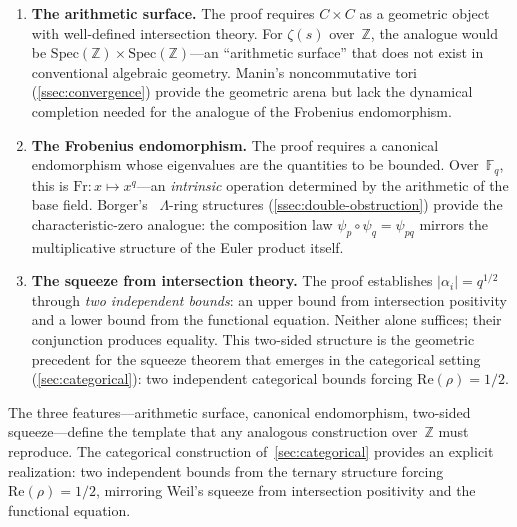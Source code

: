 \begin{enumerate}[label=(\roman*)]
  \item \textbf{The arithmetic surface.}  The proof requires
    $C \times C$ as a geometric object with well-defined intersection
    theory.  For $\zeta(s)$ over~$\mathbb{Z}$, the analogue would be
    $\mathrm{Spec}(\mathbb{Z}) \times \mathrm{Spec}(\mathbb{Z})$---an
    ``arithmetic surface'' that does not exist in conventional algebraic
    geometry.  Manin's noncommutative tori~\cite{manin04} (\cref{ssec:convergence}) provide the
    geometric arena but lack the dynamical completion needed for the
    analogue of the Frobenius endomorphism.

  \item \textbf{The Frobenius endomorphism.}  The proof requires
    a canonical endomorphism whose eigenvalues are the quantities to
    be bounded.  Over~$\mathbb{F}_q$, this is
    $\mathrm{Fr}\colon x \mapsto x^q$---an \emph{intrinsic} operation
    determined by the arithmetic of the base field.  Borger's~\cite{borger09}
    $\Lambda$-ring structures (\cref{ssec:double-obstruction}) provide the characteristic-zero
    analogue: the composition law
    $\psi_p \circ \psi_q = \psi_{pq}$ mirrors the multiplicative
    structure of the Euler product itself.

  \item \textbf{The squeeze from intersection theory.}  The proof
    establishes $|\alpha_i| = q^{1/2}$ through \emph{two independent
    bounds}: an upper bound from intersection positivity and a
    lower bound from the functional equation.  Neither alone suffices;
    their conjunction produces equality.  This two-sided structure is
    the geometric precedent for the squeeze theorem that emerges in
    the categorical setting (\cref{sec:categorical}): two independent
    categorical bounds forcing $\mathrm{Re}(\rho) = 1/2$.
\end{enumerate}

The three features---arithmetic surface, canonical endomorphism,
two-sided squeeze---define the template that any analogous
construction over~$\mathbb{Z}$ must reproduce.  The categorical
construction of~\cref{sec:categorical} provides an explicit realization: two
independent bounds from the ternary structure forcing
$\mathrm{Re}(\rho) = 1/2$, mirroring Weil's squeeze from
intersection positivity and the functional equation.



